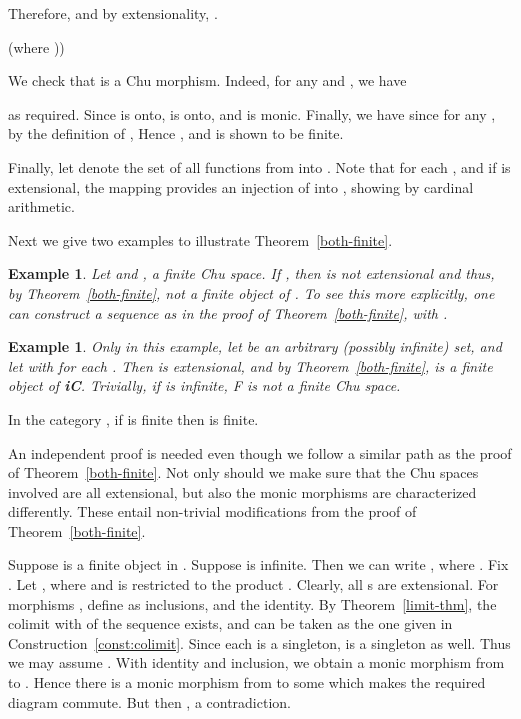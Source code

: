 \documentclass{LMCS}
\let\pf\proof
\let\epf\endproof
\newtheorem{ex}[thm]{Example}
\begin{document}
Therefore,  and by extensionality,  . 

 (where ))

We check that   is a Chu morphism. 
Indeed, for any  and , we have


as required. 
Since  is onto,  is onto, and  is
monic. Finally,
we have  since for any ,
by the definition of , 
Hence , and  is shown to be
finite. 

Finally, let  denote the set of all functions from  into
. Note that  for each , and if
 is extensional, the mapping  provides an
injection of  into , showing  by cardinal arithmetic. \epf


Next we give two examples to illustrate Theorem~\ref{both-finite}. 

\begin{ex}\label{finite-example}
  Let  and , a
  finite Chu space. If , then  is not
  extensional and thus, by Theorem~\ref{both-finite}, not a finite
  object of . To see this more explicitly, one can
  construct a sequence  as in the
  proof of Theorem~\ref{both-finite}, with . 
\end{ex}

\begin{ex}\label{ex:Sig-infinite}
  Only in this example, let  be an arbitrary (possibly
  infinite) set, and let  with
   for each . Then  is extensional, and by Theorem~\ref{both-finite},  is a
  finite object of {\bf iC}. Trivially, if  is infinite, {\sf
    F} is not a finite Chu space. 
\end{ex}



\begin{thm}\label{finite-E-onlyif}
  In the category , if  is finite then 
  is finite. 
\end{thm}

An independent proof is needed even though we follow a similar path as the proof of Theorem~\ref{both-finite}. 
Not only should we make sure that the Chu spaces involved are all extensional, but also the
monic morphisms are characterized differently. 
These entail non-trivial modifications from  the proof of Theorem~\ref{both-finite}. 

\pf Suppose  is a finite object in . 
Suppose  is infinite. Then we can write , where . Fix . Let , where  and  is  restricted to the
product .  Clearly, all
s are extensional.  For morphisms , define  as inclusions, and
 the identity.  By
Theorem~\ref{limit-thm}, the colimit  with  of the sequence  exists, and can be taken as the one
given in Construction~\ref{const:colimit}.  Since each  is a
singleton,  is a singleton as well.  Thus we may assume . 
With  identity and  inclusion, we obtain a
monic morphism  from  to .  Hence there is
a monic morphism  from  to some  which
makes the required diagram commute. But then , a contradiction.  \epf
\end{document}
